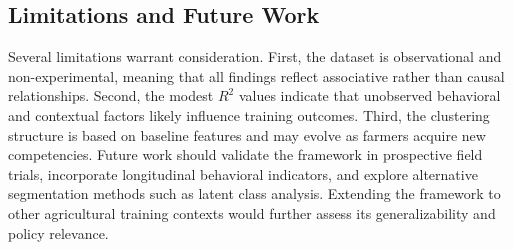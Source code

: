 \subsection{Limitations and Future Work}

Several limitations warrant consideration. First, the dataset is observational and non-experimental, meaning that all findings reflect associative rather than causal relationships. Second, the modest $R^2$ values indicate that unobserved behavioral and contextual factors likely influence training outcomes. Third, the clustering structure is based on baseline features and may evolve as farmers acquire new competencies. Future work should validate the framework in prospective field trials, incorporate longitudinal behavioral indicators, and explore alternative segmentation methods such as latent class analysis. Extending the framework to other agricultural training contexts would further assess its generalizability and policy relevance.
